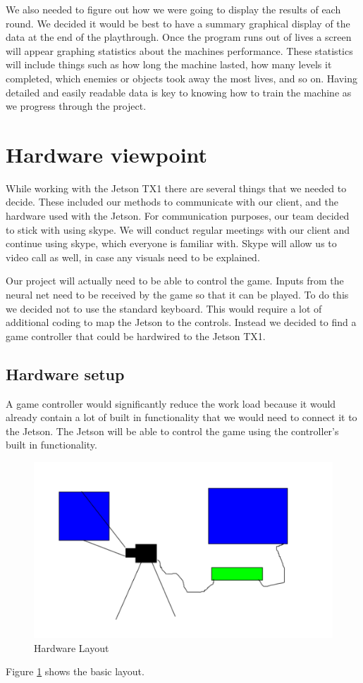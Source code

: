 \documentclass{scrreprt}
\begin{document}
We also needed to figure out how we were going to display the results of each round.
We decided it would be best to have a summary graphical display of the data at the end of the playthrough.
Once the program runs out of lives a screen will appear graphing statistics about the machines performance.
These statistics will include things such as how long the machine lasted, how many levels it completed, which enemies or objects took away the most lives, and so on.
Having detailed and easily readable data is key to knowing how to train the machine as we progress through the project.

\section{Hardware viewpoint}%

While working with the Jetson TX1 there are several things that we needed to decide.
These included our methods to communicate with our client, and the hardware used with the Jetson.
For communication purposes, our team decided to stick with using skype.
We will conduct regular meetings with our client and continue using skype, which everyone is familiar with.
Skype will allow us to video call as well, in case any visuals need to be explained.

Our project will actually need to be able to control the game.
Inputs from the neural net need to be received by the game so that it can be played.
To do this we decided not to use the standard keyboard.
This would require a lot of additional coding to map the Jetson to the controls.
Instead we decided to find a game controller that could be hardwired to the Jetson TX1.

\subsection{Hardware setup}%

A game controller would significantly reduce the work load because it would already contain a lot of built in functionality that we would need to connect it to the Jetson.
The Jetson will be able to control the game using the controller's built in functionality.

\begin{figure}
  \includegraphics[natwidth=50,natheight=100]{./design.png}
  \caption{Hardware Layout}
  \label{fig:design1}
\end{figure}
Figure \ref{fig:design1} shows the basic layout.
\end{document}
